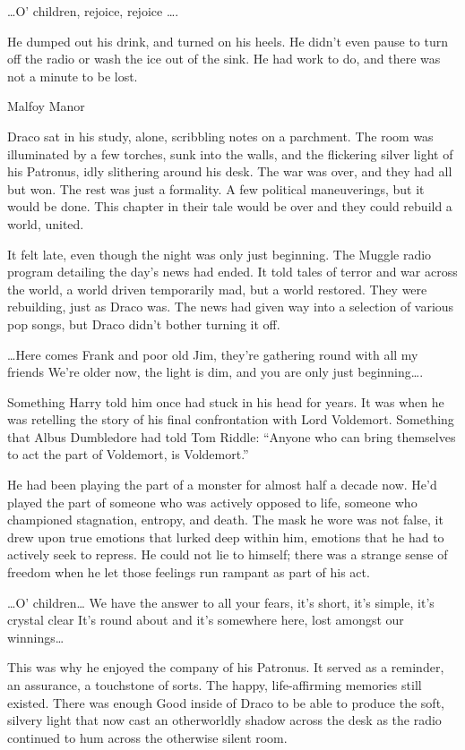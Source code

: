 …O’ children, rejoice, rejoice ….

He dumped out his drink, and turned on his heels. He didn’t even pause to turn off the radio or wash the ice out of the sink. He had work to do, and there was not a minute to be lost.

Malfoy Manor

Draco sat in his study, alone, scribbling notes on a parchment. The room was illuminated by a few torches, sunk into the walls, and the flickering silver light of his Patronus, idly slithering around his desk. The war was over, and they had all but won. The rest was just a formality. A few political maneuverings, but it would be done. This chapter in their tale would be over and they could rebuild a world, united.

It felt late, even though the night was only just beginning. The Muggle radio program detailing the day’s news had ended. It told tales of terror and war across the world, a world driven temporarily mad, but a world restored. They were rebuilding, just as Draco was. The news had given way into a selection of various pop songs, but Draco didn’t bother turning it off.

…Here comes Frank and poor old Jim, they’re gathering round with all my friends
We’re older now, the light is dim, and you are only just beginning….

Something Harry told him once had stuck in his head for years. It was when he was retelling the story of his final confrontation with Lord Voldemort. Something that Albus Dumbledore had told Tom Riddle: “Anyone who can bring themselves to act the part of Voldemort, is Voldemort.”

He had been playing the part of a monster for almost half a decade now. He’d played the part of someone who was actively opposed to life, someone who championed stagnation, entropy, and death. The mask he wore was not false, it drew upon true emotions that lurked deep within him, emotions that he had to actively seek to repress. He could not lie to himself; there was a strange sense of freedom when he let those feelings run rampant as part of his act.

…O’ children… We have the answer to all your fears, it’s short, it’s simple, it’s crystal clear
It’s round about and it’s somewhere here, lost amongst our winnings…

This was why he enjoyed the company of his Patronus. It served as a reminder, an assurance, a touchstone of sorts. The happy, life-affirming memories still existed. There was enough Good inside of Draco to be able to produce the soft, silvery light that now cast an otherworldly shadow across the desk as the radio continued to hum across the otherwise silent room.


